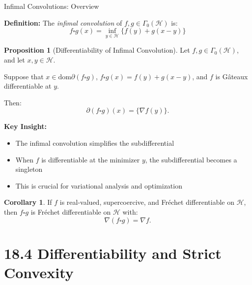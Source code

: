 \documentclass[aspectratio=169,10pt]{beamer}
\theoremstyle{definition}
\newtheorem{proposition}{Proposition}
\newtheorem{corollary}{Corollary}
\begin{document}
\begin{frame}[allowframebreaks]{Infimal Convolutions: Overview}

\textbf{Definition:} The \emph{infimal convolution} of $f, g \in \Gamma_0(\mathcal{H})$ is:
$$f \square g(x) = \inf_{y \in \mathcal{H}} \{f(y) + g(x - y)\}$$

\vspace{0.3cm}

\begin{proposition}[Differentiability of Infimal Convolution]
Let $f, g \in \Gamma_0(\mathcal{H})$, and let $x, y \in \mathcal{H}$.

Suppose that $x \in \text{dom} \partial (f \square g)$,
$f \square g(x) = f(y) + g(x-y)$, and $f$ is Gâteaux differentiable at $y$.

Then:
$$\partial(f \square g)(x) = \{\nabla f(y)\}.$$
\end{proposition}

\vspace{0.3cm}

\textbf{Key Insight:}
\begin{itemize}
  \item The infimal convolution simplifies the subdifferential
  \item When $f$ is differentiable at the minimizer $y$, the subdifferential becomes a singleton
  \item This is crucial for variational analysis and optimization
\end{itemize}

\vspace{0.3cm}

\begin{corollary}
If $f$ is real-valued, supercoercive, and Fréchet differentiable on $\mathcal{H}$,
then $f \square g$ is Fréchet differentiable on $\mathcal{H}$ with:
$$\nabla(f \square g) = \nabla f.$$
\end{corollary}

\end{frame}


\section{18.4 Differentiability and Strict Convexity}
\end{document}
